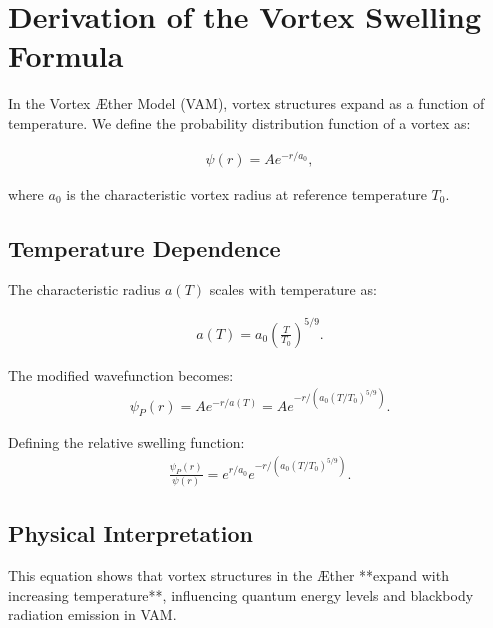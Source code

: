 

\section{Derivation of the Vortex Swelling Formula}

In the Vortex Æther Model (VAM), vortex structures expand as a function of temperature. We define the probability distribution function of a vortex as:

\begin{align}
    \psi(r) = A e^{-r/a_0},
\end{align}

where \( a_0 \) is the characteristic vortex radius at reference temperature \( T_0 \).

\subsection{Temperature Dependence}
The characteristic radius \( a(T) \) scales with temperature as:

\begin{align}
    a(T) = a_0 \left(\frac{T}{T_0}\right)^{5/9}.
\end{align}

The modified wavefunction becomes:
\begin{align}
    \psi_P(r) = A e^{-r/a(T)} = A e^{-r/(a_0 (T/T_0)^{5/9})}.
\end{align}

Defining the relative swelling function:
\begin{align}
    \frac{\psi_P(r)}{\psi(r)} = e^{r/a_0} e^{-r/(a_0 (T/T_0)^{5/9})}.
\end{align}

\subsection{Physical Interpretation}
This equation shows that vortex structures in the Æther **expand with increasing temperature**, influencing quantum energy levels and blackbody radiation emission in VAM.
